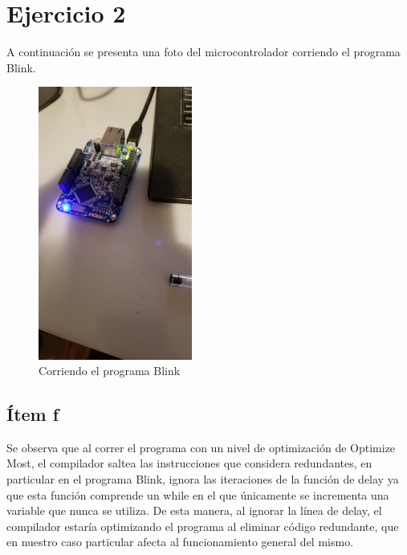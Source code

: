 \documentclass[micros_g1_main.tex]{subfiles}
\begin{document}
\section{Ejercicio 2}

A continuación se presenta una foto del microcontrolador corriendo el programa Blink. 
	\begin{figure}[H]
		\centering
		\includegraphics[width=0.45\textwidth]{images/blink_blue.jpg}
		\caption{Corriendo el programa Blink} \label{fig:cct}
	\end{figure}

\subsection{Ítem f}
Se observa que al correr el programa con un nivel de optimización de Optimize Most, el compilador saltea las instrucciones que considera redundantes, en particular en el programa Blink, ignora las iteraciones de la función de delay ya que esta función comprende un while en el que únicamente se incrementa una variable que nunca se utiliza. De esta manera, al ignorar la línea de delay, el compilador estaría optimizando el programa al eliminar código redundante, que en nuestro caso particular afecta al funcionamiento general del mismo. 
\end{document}
